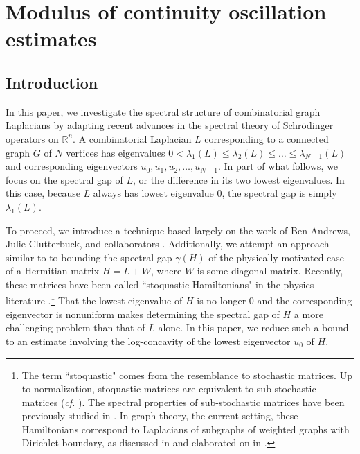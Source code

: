 \newcommand\numberthis{\addtocounter{equation}{1}\tag{\theequation}}

\let\ab\allowbreak

\chapter{Modulus of continuity oscillation estimates}

\section{Introduction} 
In this paper, we investigate the spectral structure of combinatorial graph Laplacians by adapting recent advances in the spectral theory of Schr\"odinger operators on $\mathbb{R}^n$. A combinatorial Laplacian $L$ corresponding to a connected graph $G$ of $N$ vertices has eigenvalues $0<\lambda_1(L)\leq \lambda_2(L) \leq \dots \leq \lambda_{N-1}(L)$ and corresponding eigenvectors $u_0,u_1,u_2,\dots,u_{N-1}$. In part of what follows, we focus on the spectral gap of $L$, or the difference in its two lowest eigenvalues. In this case, because $L$ always has lowest eigenvalue $0$, the spectral gap is simply $\lambda_1(L)$. 

To proceed, we introduce a technique based largely on the work of Ben Andrews, Julie Clutterbuck, and collaborators \cite{Andrews2011, andrews2012gradient, andrews2014moduli, andrews2013time, andrews2009lipschitz, andrews2013sharp}. Additionally, we attempt an approach similar to \cite{Andrews2011} to bounding the spectral gap $\gamma(H)$ of the physically-motivated case of a Hermitian matrix $H = L + W$, where $W$ is some diagonal matrix. Recently, these matrices have been called ``stoquastic Hamiltonians" in the physics literature \cite{Bravyi2006a}.\footnote{The term ``stoquastic" comes from the resemblance to stochastic matrices. Up to normalization, stoquastic matrices are equivalent to sub-stochastic matrices (\emph{cf.} \cite{Feller1956,Feller1957}). The spectral properties of sub-stochastic matrices have been previously studied in \cite{Lawler1988}. In graph theory, the current setting, these Hamiltonians correspond to Laplacians of subgraphs of weighted graphs with Dirichlet boundary, as discussed in  and elaborated on in \cite{Chung}.} That the lowest eigenvalue of $H$ is no longer $0$ and the corresponding eigenvector is nonuniform makes determining the spectral gap of $H$ a more challenging problem than that of $L$ alone. In this paper, we reduce such a bound to an estimate involving the log-concavity of the lowest eigenvector $u_0$ of $H$. 

